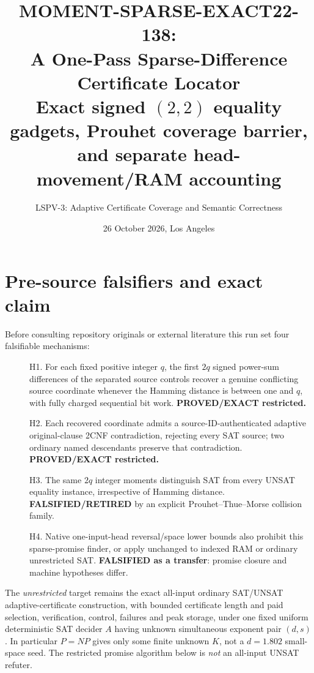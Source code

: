 \documentclass[11pt]{article}
\title{MOMENT-SPARSE-EXACT22-138:\\A One-Pass Sparse-Difference Certificate Locator\\\large Exact signed $(2,2)$ equality gadgets, Prouhet coverage barrier, and separate head-movement/RAM accounting}
\author{LSPV-3: Adaptive Certificate Coverage and Semantic Correctness}
\date{26 October 2026, Los Angeles}
\begin{document}
\maketitle
\begin{center}\end{center}

\section{Pre-source falsifiers and exact claim}
Before consulting repository originals or external literature this run set four falsifiable mechanisms:
\begin{description}
\item[] H1. For each fixed positive integer $q$, the first $2q$ signed power-sum differences of the separated source controls recover a genuine conflicting source coordinate whenever the Hamming distance is between one and $q$, with fully charged sequential bit work. \textbf{PROVED/EXACT restricted.}
\item[] H2. Each recovered coordinate admits a source-ID-authenticated adaptive original-clause 2CNF contradiction, rejecting every SAT source; two ordinary named descendants preserve that contradiction. \textbf{PROVED/EXACT restricted.}
\item[] H3. The same $2q$ integer moments distinguish SAT from every UNSAT equality instance, irrespective of Hamming distance. \textbf{FALSIFIED/RETIRED} by an explicit Prouhet--Thue--Morse collision family.
\item[] H4. Native one-input-head reversal/space lower bounds also prohibit this sparse-promise finder, or apply unchanged to indexed RAM or ordinary unrestricted SAT. \textbf{FALSIFIED as a transfer}: promise closure and machine hypotheses differ.
\end{description}
The \emph{unrestricted} target remains the exact all-input ordinary SAT/UNSAT adaptive-certificate construction, with bounded certificate length and paid selection, verification, control, failures and peak storage, under one fixed uniform deterministic SAT decider $A$ having unknown simultaneous exponent pair $(d,s)$. In particular $P=NP$ gives only some finite unknown $K$, not a $d=1.802$ small-space seed. The restricted promise algorithm below is \emph{not} an all-input UNSAT refuter.
\end{document}
